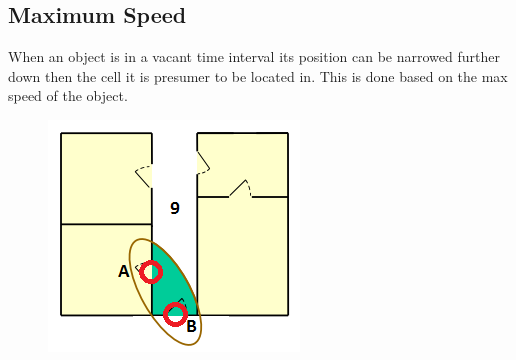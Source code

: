 \subsection{Maximum Speed}
When an object is in a vacant time interval its position can be narrowed further down then the cell it is presumer to be located in. 
This is done based on the max speed of the object. 


\begin{figure}%
\includegraphics{images/indoorspeed.png}%
\caption{}%
\label{}%
\end{figure}

